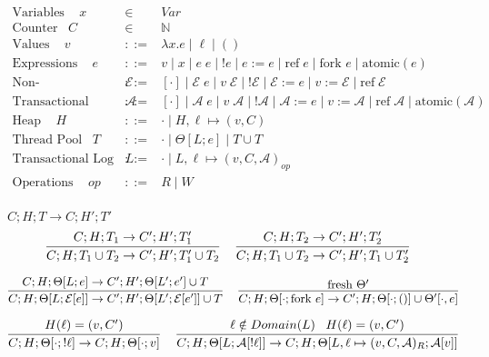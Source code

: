 \documentclass[9pt]{article}
\newcommand{\aeval}[1]{\mathcal{A}[#1]}
\newcommand{\actxt}[0]{\mathcal{A}}
\newcommand{\eval}[1]{\mathcal{E}[#1]}
\newcommand{\ctxt}[0]{\mathcal{E}}
\newcommand{\loc}[0]{\ell}
\newcommand{\atomic}[1]{\text{atomic}(#1)}
\newcommand{\alloc}[1]{\text{ref} \; #1}
\newcommand{\fork}[1]{\text{fork } #1}
\begin{document}
\begingroup\makeatletter{}\check@mathfonts


\begin{displaymath}
\begin{array}{rcll}
\text{Variables } \;\;\; x &\in& Var \\
\text{Counter} \;\;\; C &\in& \mathbb{N} \\
\text{Values } \;\;\; v &::=& \lambda x. e \; | \; \loc \; | \; () \\
\text{Expressions } \;\;\; e &::=& v \; | \; x \; | \; e \; e \; | \; !e \; | \; e := e \; | \; \alloc{e} \; | \; \fork{e} \; | \; \atomic{e}\\
\text{Non-Transactional Context } \;\;\; \ctxt &::=& [\cdot] \; | \; \ctxt \; e \; | \; v \; \ctxt \; | \; ! \ctxt \; | \; \ctxt := e \; | \; v := \ctxt \; | \; \alloc{\ctxt} \\
\text{Transactional Context } \;\;\; \actxt &::=& [\cdot] \; | \; \actxt \; e \; | \; v \; \actxt \; | \; ! \actxt \; | \; \actxt := e \; | \; v := \actxt \; | \; \alloc{\actxt} \; | \; \atomic{\actxt} \\
\text{Heap } \;\;\; H &::=& \cdot \; | \; H, \loc \mapsto (v, C) \\
\text{Thread Pool} \;\;\; T &::=& \cdot \; | \; \Theta[L; e] \; | \; T \cup T \\
\text{Transactional Log } \;\;\; L &::=& \cdot \; | \; L, \loc \mapsto (v, C, \actxt)_{op}  \\
\text{Operations } \;\;\; op &::=& R \; | \; W \\
\end{array}
\end{displaymath}

$\boxed{C; H; T \rightarrow C; H' ;T'}$
\[%
\infer[]{C; H; T_1 \cup T_2 \rightarrow C'; H'; T_1' \cup T_2}{C; H; T_1 \rightarrow C'; H'; T_1'} \;\;\;
\infer[]{C; H; T_1 \cup T_2 \rightarrow C'; H'; T_1 \cup T_2'}{C; H; T_2 \rightarrow C'; H'; T_2'} \;\;\; 
\]

\[%
\infer[]{C; H; \Theta[L; \eval{e}] \rightarrow C'; H'; \Theta[L'; \eval{e'}] \cup T}{C; H; \Theta[L; e] \rightarrow C'; H'; \Theta[L'; e'] \cup T} \;\;\;
\infer[]{C; H; \Theta[\cdot; \fork{e}] \rightarrow C'; H; \Theta[\cdot; ()] \cup \Theta'[\cdot, e]}{\text{fresh } \Theta'}
\]

\[%
\infer[]{C; H; \Theta[\cdot; !\loc] \rightarrow C; H; \Theta[\cdot; v]}{H(\loc) = (v, C')} \;\;\;
\infer[]{C; H; \Theta[L; \aeval{!\loc}] \rightarrow C; H; \Theta[L, \loc \mapsto (v, C, \actxt)_R; \aeval{v}]}{\loc \notin Domain(L) \;\;\; H(\loc) = (v, C') } 
\]
\end{document}
